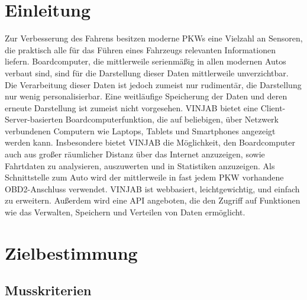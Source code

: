 \documentclass[pflichtenheft.tex]{subfiles}
\begin{document}
\chapter{Einleitung}

Zur Verbesserung des Fahrens besitzen moderne PKWs eine Vielzahl an Sensoren, die praktisch alle für das Führen eines Fahrzeugs relevanten Informationen liefern. Boardcomputer, die mittlerweile serienmäßig in allen modernen Autos verbaut sind, sind für die Darstellung dieser Daten mittlerweile unverzichtbar. Die Verarbeitung dieser Daten ist jedoch zumeist nur rudimentär, die Darstellung nur wenig personalisierbar. Eine weitläufige Speicherung der Daten und deren erneute Darstellung ist zumeist nicht vorgesehen. VINJAB bietet eine Client-Server-basierten Boardcomputerfunktion, die auf beliebigen, über Netzwerk verbundenen Computern wie Laptops, Tablets und Smartphones angezeigt werden kann. Insbesondere bietet VINJAB die Möglichkeit, den Boardcomputer auch aus großer räumlicher Distanz über das Internet anzuzeigen, sowie Fahrtdaten zu analysieren, auszuwerten und in Statistiken anzuzeigen. Als Schnittstelle zum Auto wird der mittlerweile in fast jedem PKW vorhandene OBD2-Anschluss verwendet. VINJAB ist webbasiert, leichtgewichtig, und einfach zu erweitern. Außerdem wird eine API angeboten, die den Zugriff auf Funktionen wie das Verwalten, Speichern und Verteilen von Daten ermöglicht. 

\chapter{Zielbestimmung}

\section{Musskriterien}

\renewcommand{\theenumi}{/MK\ifnum \value{enumi}<10 0\fi\arabic{enumi}0/}
\renewcommand{\labelenumi}{\theenumi}
\renewcommand{\theenumii}{\arabic{enumii}}
\renewcommand{\labelenumii}{/MK\ifnum \value{enumi}<10 0\fi\arabic{enumi}\arabic{enumii}/}
\end{document}
